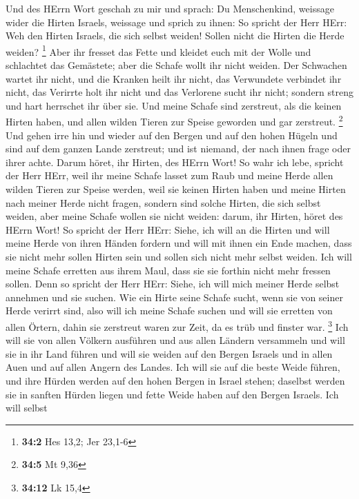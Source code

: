  Und des HErrn Wort geschah zu mir und sprach:
 Du Menschenkind, weissage wider die Hirten Israels,
weissage und sprich zu ihnen: So spricht der Herr HErr: Weh den Hirten
Israels, die sich selbst weiden! Sollen nicht die Hirten die Herde
weiden? \footnote{\textbf{34:2} Hes 13,2; Jer 23,1-6} 
Aber ihr fresset das Fette und kleidet euch mit der Wolle und schlachtet
das Gemästete; aber die Schafe wollt ihr nicht weiden. 
Der Schwachen wartet ihr nicht, und die Kranken heilt ihr nicht, das
Verwundete verbindet ihr nicht, das Verirrte holt ihr nicht und das
Verlorene sucht ihr nicht; sondern streng und hart herrschet ihr über
sie.  Und meine Schafe sind zerstreut, als die keinen
Hirten haben, und allen wilden Tieren zur Speise geworden und gar
zerstreut. \footnote{\textbf{34:5} Mt 9,36}  Und gehen
irre hin und wieder auf den Bergen und auf den hohen Hügeln und sind auf
dem ganzen Lande zerstreut; und ist niemand, der nach ihnen frage oder
ihrer achte.  Darum höret, ihr Hirten, des HErrn Wort!
 So wahr ich lebe, spricht der Herr HErr, weil ihr meine
Schafe lasset zum Raub und meine Herde allen wilden Tieren zur Speise
werden, weil sie keinen Hirten haben und meine Hirten nach meiner Herde
nicht fragen, sondern sind solche Hirten, die sich selbst weiden, aber
meine Schafe wollen sie nicht weiden:  darum, ihr Hirten,
höret des HErrn Wort!  So spricht der Herr HErr: Siehe,
ich will an die Hirten und will meine Herde von ihren Händen fordern und
will mit ihnen ein Ende machen, dass sie nicht mehr sollen Hirten sein
und sollen sich nicht mehr selbst weiden. Ich will meine Schafe erretten
aus ihrem Maul, dass sie sie forthin nicht mehr fressen sollen.
 Denn so spricht der Herr HErr: Siehe, ich will mich
meiner Herde selbst annehmen und sie suchen.  Wie ein
Hirte seine Schafe sucht, wenn sie von seiner Herde verirrt sind, also
will ich meine Schafe suchen und will sie erretten von allen Örtern,
dahin sie zerstreut waren zur Zeit, da es trüb und finster war.
\footnote{\textbf{34:12} Lk 15,4}  Ich will sie von allen
Völkern ausführen und aus allen Ländern versammeln und will sie in ihr
Land führen und will sie weiden auf den Bergen Israels und in allen Auen
und auf allen Angern des Landes.  Ich will sie auf die
beste Weide führen, und ihre Hürden werden auf den hohen Bergen in
Israel stehen; daselbst werden sie in sanften Hürden liegen und fette
Weide haben auf den Bergen Israels.  Ich will selbst
